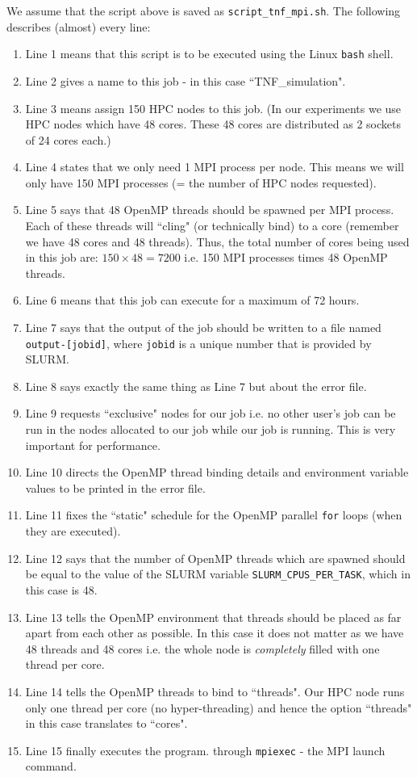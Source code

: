 \documentclass[12pt]{article}
\begin{document}
We assume that the script above is saved as \texttt{script\_tnf\_mpi.sh}. The following describes (almost) every line:
\begin{enumerate}
    \item Line 1 means that this script is to be executed using the Linux \texttt{bash} shell.
    \item Line 2 gives a name to this job - in this case ``TNF\_simulation". 
    \item Line 3 means assign 150 HPC nodes to this job. (In our experiments we use HPC nodes which have 48 cores. These 48 cores are distributed as 2 sockets of 24 cores each.)
    \item Line 4 states that we only need 1 MPI process per node. This means we will only have 150 MPI processes (= the number of HPC nodes requested). 
    \item Line 5 says that 48 OpenMP threads should be spawned per MPI process. Each of these threads will ``cling" (or technically bind) to a core (remember we have 48 cores and 48 threads). Thus, the total number of cores being used in this job are: $150 \times 48 = 7200$ i.e. 150 MPI processes times 48 OpenMP threads. 
    \item Line 6 means that this job can execute for a maximum of 72 hours. 
    \item Line 7 says that the output of the job should be written to a file named \texttt{output-[jobid]}, where \texttt{jobid} is a unique number that is provided by SLURM. 
    \item Line 8 says exactly the same thing as Line 7 but about the error file. 
    \item Line 9 requests ``exclusive" nodes for our job i.e. no other user's job can be run in the nodes allocated to our job while our job is running. This is very important for performance. 
    \item Line 10 directs the OpenMP thread binding details and environment variable values to be printed in the error file.
    \item Line 11 fixes the ``static" schedule for the OpenMP parallel \texttt{for} loops (when they are executed).
    \item Line 12 says that the number of OpenMP threads which are spawned should be equal to the value of the SLURM variable \texttt{SLURM\_CPUS\_PER\_TASK}, which in this case is 48. 
    \item Line 13 tells the OpenMP environment that threads should be placed as far apart from each other as possible. In this case it does not matter as we have 48 threads and 48 cores i.e. the whole node is \textit{completely} filled with one thread per core. 
    \item Line 14 tells the OpenMP threads to bind to ``threads". Our HPC node runs only one thread per core (no hyper-threading) and hence the option ``threads" in this case translates to ``cores".
    \item Line 15 finally executes the program. through \texttt{mpiexec} - the MPI launch command. 
\end{enumerate}
\end{document}
